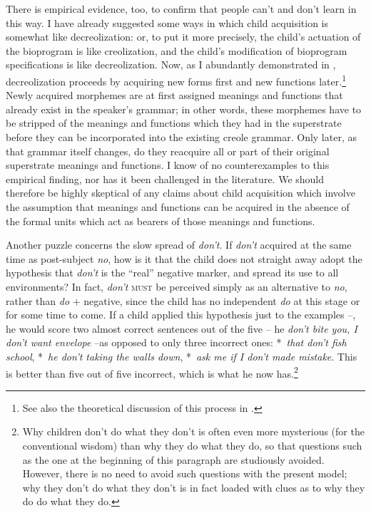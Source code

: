 There is empirical evidence, too, to confirm that people can't and don't learn in this way. I have already suggested some ways in which child acquisition is somewhat like decreolization: or, to put it more precisely, the child's actuation of the bioprogram is like creoliza\-tion, and the child's modification of bioprogram specifications is like decreolization. Now, as I abundantly demonstrated in \citet{Bickerton1975}, decreolization proceeds by acquiring new forms first and new functions later.\footnote{See also the theoretical discussion of this process in \citet{Bickerton1980}.} Newly acquired morphemes are at first assigned
meanings and functions that already exist in the speaker's grammar; in other words, these morphemes have to be stripped of the meanings and functions which they had in the superstrate before they can be incorporated into the existing creole grammar. Only later, as that grammar itself changes, do they reacquire all or part of their original superstrate meanings and functions. I know of no counterexamples to this empirical finding, nor has it been challenged in the literature. We should therefore be highly skeptical of any claims about child acquisition which involve the assumption that meanings and functions can be acquired in the absence of the formal units which act as bearers of those meanings and functions.

Another puzzle concerns the slow spread of \textit{don't}. If \textit{don't} acquired at the same time as post-subject \textit{no}, how is it that the child does not straight away adopt the hypothesis that \textit{don't} is the ``real'' negative marker, and spread its use to all environments? In fact, \textit{don't} \textsc{must} be perceived simply as an alternative to \textit{no}, rather than \textit{do} + negative, since the child has no independent \textit{do} at this stage or for some time to come. If a child applied this hypothesis just to the examples --, he would score two almost correct sentences out of the five -- he \textit{don't bite you, I don't want envelope} --as opposed to only three incorrect ones: *~\textit{that don't fish school}, *~\textit{he don't taking the walls down}, *~\textit{ask me if I don't made mistake}. This is better than five out of five incorrect, which is what he now has.\footnote{Why children don't do what they don't is often even more mysterious (for the conventional wisdom) than why they do what they do, so that questions such as the one at the beginning of this paragraph are studiously avoided. However, there is no need to avoid such questions with the present model; why they don't do what they don't is in fact loaded with clues as to why they do do what they do.}

